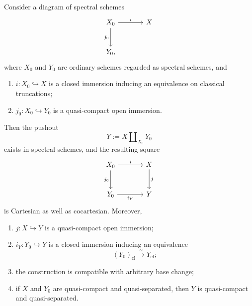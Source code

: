 \begin{proposition}
\label{prop:spectral-nil-cobase-change-open}
Consider a diagram of spectral schemes
\[
\begin{tikzcd}[column sep=large,row sep=large]
    X_0 \arrow[r,"i"] \arrow[d,"j_0"']
        & X \\
    Y_0,
\end{tikzcd}
\]
where \(X_0\) and \(Y_0\) are ordinary schemes regarded as spectral
schemes, and

\begin{enumerate}
    \item \(i:X_0\hookrightarrow X\) is a closed immersion inducing an
    equivalence on classical truncations;

    \item \(j_0:X_0\hookrightarrow Y_0\) is a quasi-compact open immersion.
\end{enumerate}

Then the pushout
\[
    Y
    :=
    X\amalg_{X_0}Y_0
\]
exists in spectral schemes, and the resulting square
\[
\begin{tikzcd}[column sep=large,row sep=large]
    X_0 \arrow[r,"i"] \arrow[d,"j_0"']
        & X \arrow[d,"j"] \\
    Y_0 \arrow[r,"i_Y"']
        & Y
\end{tikzcd}
\]
is Cartesian as well as cocartesian.  Moreover,

\begin{enumerate}
    \item \(j:X\hookrightarrow Y\) is a quasi-compact open immersion;

    \item \(i_Y:Y_0\hookrightarrow Y\) is a closed immersion inducing an
    equivalence
    \[
        (Y_0)_{\mathrm{cl}}
        \xrightarrow{\simeq}
        Y_{\mathrm{cl}};
    \]

    \item the construction is compatible with arbitrary base change;

    \item if \(X\) and \(Y_0\) are quasi-compact and quasi-separated, then
    \(Y\) is quasi-compact and quasi-separated.
\end{enumerate}
\end{proposition}

